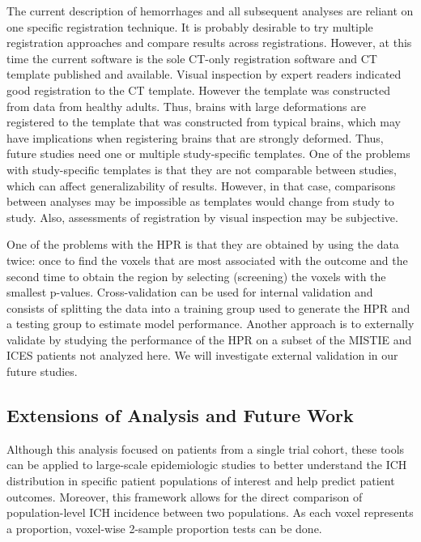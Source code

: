 \documentclass[10pt]{article}\usepackage[]{graphicx}\usepackage[]{color}
\begin{document}
The current description of hemorrhages and all subsequent analyses are reliant on one specific registration technique.  It is probably desirable \cite{eloyan_ms} to try multiple registration approaches and compare results across registrations.
However, at this time the current software is the sole CT-only registration software and CT template published and available.  Visual inspection by expert readers indicated good registration to the CT template. However the template was constructed from data from healthy adults.  Thus, brains with large deformations are registered to the template that was constructed from typical brains, which may have implications when registering brains that are strongly deformed.  Thus, future studies need one or multiple study-specific templates.  One of the problems with study-specific templates is that they are not comparable between studies, which can affect generalizability of results.
However, in that case, comparisons between analyses may be impossible as templates would change from study to study.  Also, assessments of registration by visual inspection may be subjective.

One of the problems with the HPR is that they are obtained by using the data twice: once to find the voxels that are most associated with the outcome and the second time to obtain the region by selecting (screening) the voxels with the smallest p-values. Cross-validation can be used for internal validation and consists of splitting the data into a training group used to generate the HPR and a testing group to estimate model performance.  Another approach is to externally validate by studying the performance of the HPR on a subset of the MISTIE and ICES patients not analyzed here. We will investigate external validation in our future studies.  

\subsection{Extensions of Analysis and Future Work }
Although this analysis focused on patients from a single trial cohort, these tools can be applied to large-scale epidemiologic studies to better understand the ICH distribution in specific patient populations of interest and help predict patient outcomes.  Moreover, this framework allows for the direct comparison of population-level ICH incidence between two populations.  As each voxel represents a proportion, voxel-wise 2-sample proportion tests can be done.
\end{document}
